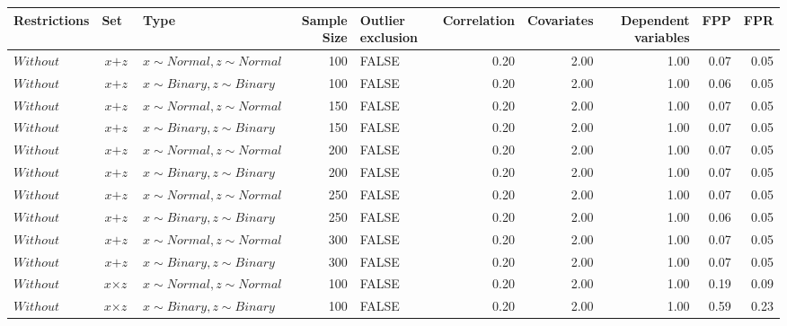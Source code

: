 \begin{longtable}{lllrlrrrrr}

  \hline
Restrictions & Set & Type & Sample Size & Outlier exclusion & Correlation & Covariates & Dependent variables & FPP & FPR \\ 
  \hline
$Without$ & $\textit{x} + \textit{z}$ & $\textit{x} \sim Normal , \textit{z} \sim Normal$ & 100 & FALSE & 0.20 & 2.00 & 1.00 & 0.07 & 0.05 \\ 
  $Without$ & $\textit{x} + \textit{z}$ & $\textit{x} \sim Binary, \textit{z} \sim Binary$ & 100 & FALSE & 0.20 & 2.00 & 1.00 & 0.06 & 0.05 \\ 
  $Without$ & $\textit{x} + \textit{z}$ & $\textit{x} \sim Normal , \textit{z} \sim Normal$ & 150 & FALSE & 0.20 & 2.00 & 1.00 & 0.07 & 0.05 \\ 
  $Without$ & $\textit{x} + \textit{z}$ & $\textit{x} \sim Binary, \textit{z} \sim Binary$ & 150 & FALSE & 0.20 & 2.00 & 1.00 & 0.07 & 0.05 \\ 
  $Without$ & $\textit{x} + \textit{z}$ & $\textit{x} \sim Normal , \textit{z} \sim Normal$ & 200 & FALSE & 0.20 & 2.00 & 1.00 & 0.07 & 0.05 \\ 
  $Without$ & $\textit{x} + \textit{z}$ & $\textit{x} \sim Binary, \textit{z} \sim Binary$ & 200 & FALSE & 0.20 & 2.00 & 1.00 & 0.07 & 0.05 \\ 
  $Without$ & $\textit{x} + \textit{z}$ & $\textit{x} \sim Normal , \textit{z} \sim Normal$ & 250 & FALSE & 0.20 & 2.00 & 1.00 & 0.07 & 0.05 \\ 
  $Without$ & $\textit{x} + \textit{z}$ & $\textit{x} \sim Binary, \textit{z} \sim Binary$ & 250 & FALSE & 0.20 & 2.00 & 1.00 & 0.06 & 0.05 \\ 
  $Without$ & $\textit{x} + \textit{z}$ & $\textit{x} \sim Normal , \textit{z} \sim Normal$ & 300 & FALSE & 0.20 & 2.00 & 1.00 & 0.07 & 0.05 \\ 
  $Without$ & $\textit{x} + \textit{z}$ & $\textit{x} \sim Binary, \textit{z} \sim Binary$ & 300 & FALSE & 0.20 & 2.00 & 1.00 & 0.07 & 0.05 \\ 
  $Without$ & $\textit{x} \times \textit{z}$ & $\textit{x} \sim Normal , \textit{z} \sim Normal$ & 100 & FALSE & 0.20 & 2.00 & 1.00 & 0.19 & 0.09 \\ 
  $Without$ & $\textit{x} \times \textit{z}$ & $\textit{x} \sim Binary, \textit{z} \sim Binary$ & 100 & FALSE & 0.20 & 2.00 & 1.00 & 0.59 & 0.23 \\ 

\end{longtable}
